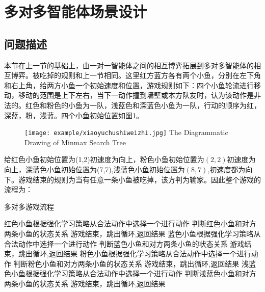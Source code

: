 \section{多对多智能体场景设计}

\subsection{问题描述}
本节在上一节的基础上，由一对一智能体之间的相互博弈拓展到多对多智能体的相互博弈。被吃掉的规则和上一节相同。这里红方蓝方各有两个小鱼，分别在左下角和右上角，给两方小鱼一个初始速度和位置，游戏规则如下：四个小鱼轮流进行移动，移动的范围是上下左右，当下一动作撞到墙壁或本方队友时，认为该动作是非法的。红色和粉色的小鱼为一队，浅蓝色和深蓝色小鱼为一队，行动的顺序为红，深蓝，粉，浅蓝。四个小鱼初始位置如图\ref{小鱼初始位置}。

\begin{figure}[!htbp]
	\centering
	\texttt{[image: example/xiaoyuchushiweizhi.jpg]}
	{The Diagrammatic Drawing of Minmax Search Tree}
	\label{小鱼初始位置}
\end{figure}

给红色小鱼初始位置为(1,2)初速度为向上，粉色小鱼初始位置为$(2,2)$初速度为向上，深蓝色小鱼初始位置为(7,7),浅蓝色小鱼初始位置为$(8,7)$,初速度都为向下。游戏结束的规则为当有任意一条小鱼被吃掉，该方判为输家。因此整个游戏的流程为：

\begin{algorithm}[!htbp]
	\caption{多对多游戏流程}%
	\begin{algorithmic}[1]%
		\State 红色小鱼根据强化学习策略从合法动作中选择一个进行动作
		\State 判断红色小鱼和对方两条小鱼的状态关系
		\State 游戏结束，跳出循环,返回结果
		\EndIf
		\State 蓝色小鱼根据强化学习策略从合法动作中选择一个进行动作
		\State 判断蓝色小鱼和对方两条小鱼的状态关系
		\State 游戏结束，跳出循环,返回结果
		\EndIf
		\State 粉色小鱼根据强化学习策略从合法动作中选择一个进行动作
		\State 判断粉色小鱼和对方两条小鱼的状态关系
		\State 游戏结束，跳出循环,返回结果
		\EndIf
		\State 浅蓝色小鱼根据强化学习策略从合法动作中选择一个进行动作
		\State 判断浅蓝色小鱼和对方两条小鱼的状态关系
		\State 游戏结束，跳出循环,返回结果
		\EndIf
		
		\EndFor
	\end{algorithmic}
\end{algorithm}
